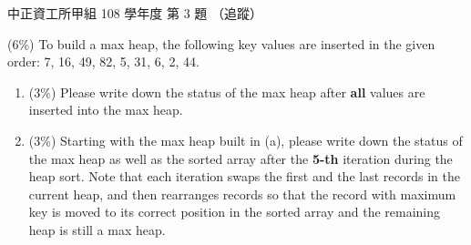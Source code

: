 \begin{pastexam}[label={px:ccu-108-swa-02}]{中正資工所甲組 108 學年度 第 3 題}
（追蹤）

(6\%) To build a max heap, the following key values are inserted in the given order: 7, 16, 49,
82, 5, 31, 6, 2, 44.
\begin{enumerate}[label=(\alph*)]
\item (3\%) Please write down the status of the max heap after \textbf{all} values are inserted
into the max heap.
\item (3\%) Starting with the max heap built in (a), please write down the status of the max heap
as well as the sorted array after the \textbf{5-th} iteration during the heap sort. Note that each
iteration swaps the first and the last records in the current heap, and then rearranges records
so that the record with maximum key is moved to its correct position in the sorted array and the
remaining heap is still a max heap.
\end{enumerate}
\end{pastexam}

